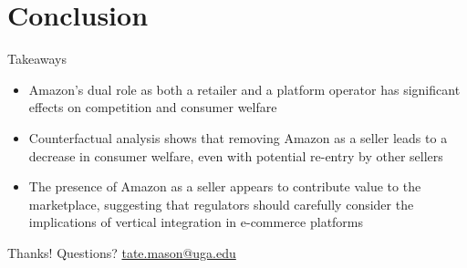 \documentclass[aspectratio=169,professionalfonts]{beamer}
\begin{document}
\section{Conclusion}

\begin{frame}{Takeaways}
  \begin{itemize}
    \item Amazon's dual role as both a retailer and a platform operator has significant effects on competition and consumer welfare
    \item Counterfactual analysis shows that removing Amazon as a seller leads to a decrease in consumer welfare, even with potential re-entry by other sellers
    \item The presence of Amazon as a seller appears to contribute value to the marketplace, suggesting that regulators should carefully consider the implications of vertical integration in e-commerce platforms
  \end{itemize}
\end{frame}

\begin{frame}{Thanks!}
  \centering
  Questions? \quad \href{mailto:}{tate.mason@uga.edu}
\end{frame}
\end{document}

